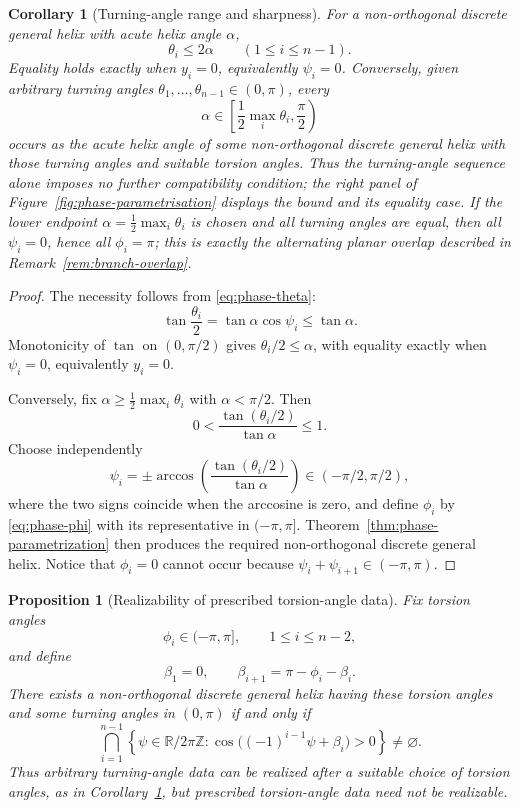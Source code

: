 \documentclass[10pt,a4paper]{amsart}
\newtheorem{corollary}[theorem]{Corollary}
\newtheorem{proposition}[theorem]{Proposition}
\theoremstyle{definition}
\theoremstyle{remark}
\numberwithin{equation}{section}
\begin{document}
\begin{corollary}[Turning-angle range and sharpness]\label{cor:turning-bound}
For a non-orthogonal discrete general helix with acute helix angle $\alpha$,
\[
\boxed{\theta_i\le 2\alpha\qquad(1\le i\le n-1).}
\]
Equality holds exactly when $y_i=0$, equivalently $\psi_i=0$.
Conversely, given arbitrary turning angles $\theta_1,\ldots,\theta_{n-1}\in(0,\pi)$, every
\[
\alpha\in\left[\frac12\max_i\theta_i,\frac\pi2\right)
\]
occurs as the acute helix angle of some non-orthogonal discrete general helix with those turning angles and suitable torsion angles. Thus the turning-angle sequence alone imposes no further compatibility condition; the right panel of Figure~\ref{fig:phase-parametrisation} displays the bound and its equality case. If the lower endpoint $\alpha=\frac12\max_i\theta_i$ is chosen and all turning angles are equal, then all $\psi_i=0$, hence all $\phi_i=\pi$; this is exactly the alternating planar overlap described in Remark~\ref{rem:branch-overlap}.
\end{corollary}

\begin{proof}
The necessity follows from \eqref{eq:phase-theta}:
\[
\tan\frac{\theta_i}{2}=\tan\alpha\cos\psi_i\le\tan\alpha.
\]
Monotonicity of $\tan$ on $(0,\pi/2)$ gives $\theta_i/2\le\alpha$, with equality exactly when $\psi_i=0$, equivalently $y_i=0$.

Conversely, fix $\alpha\ge\frac12\max_i\theta_i$ with $\alpha<\pi/2$. Then
\[
0<\frac{\tan(\theta_i/2)}{\tan\alpha}\le1.
\]
Choose independently
\[
\psi_i=\pm\arccos\!\left(\frac{\tan(\theta_i/2)}{\tan\alpha}\right)
\in(-\pi/2,\pi/2),
\]
where the two signs coincide when the arccosine is zero, and define $\phi_i$ by \eqref{eq:phase-phi} with its representative in $(-\pi,\pi]$. Theorem~\ref{thm:phase-parametrization} then produces the required non-orthogonal discrete general helix. Notice that $\phi_i=0$ cannot occur because $\psi_i+\psi_{i+1}\in(-\pi,\pi)$.
\end{proof}

\begin{proposition}[Realizability of prescribed torsion-angle data]\label{prop:torsion-realizability}
Fix torsion angles
\[
\phi_i\in(-\pi,\pi],\qquad 1\le i\le n-2,
\]
and define
\[
\beta_1=0,\qquad \beta_{i+1}=\pi-\phi_i-\beta_i.
\]
There exists a non-orthogonal discrete general helix having these torsion angles and some turning angles in $(0,\pi)$ if and only if
\[
\bigcap_{i=1}^{n-1}
\left\{
\psi\in\mathbb R/2\pi\mathbb Z:
\cos\bigl((-1)^{i-1}\psi+\beta_i\bigr)>0
\right\}
\ne\varnothing.
\]
Thus arbitrary turning-angle data can be realized after a suitable choice of torsion angles, as in Corollary~\ref{cor:turning-bound}, but prescribed torsion-angle data need not be realizable.
\end{proposition}
\end{document}
